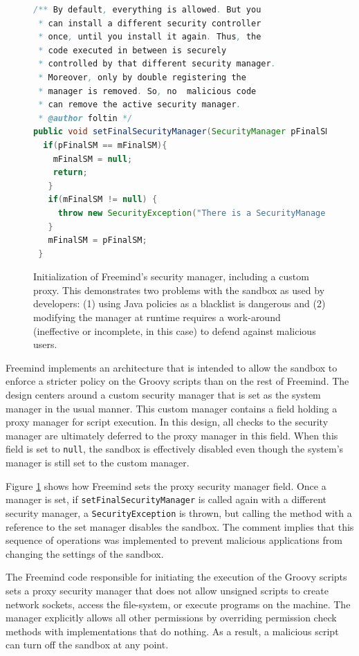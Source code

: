 \documentclass{sig-alternate-05-2015}
\begin{document}
\begin{figure}
\begin{lstlisting}[language=Java,firstnumber=31]
/** By default, everything is allowed. But you
 * can install a different security controller
 * once, until you install it again. Thus, the
 * code executed in between is securely
 * controlled by that different security manager.  
 * Moreover, only by double registering the
 * manager is removed. So, no  malicious code 
 * can remove the active security manager.  
 * @author foltin */
public void setFinalSecurityManager(SecurityManager pFinalSM) {
  if(pFinalSM == mFinalSM){
    mFinalSM = null;
    return;
   } 		
   if(mFinalSM != null) {
     throw new SecurityException("There is a SecurityManager installed already."); 		
   } 		
   mFinalSM = pFinalSM;
 }	
\end{lstlisting}
\caption{Initialization of Freemind's 
  \label{fig:Freemind-Security-Manager} security manager, including a custom proxy.
  This demonstrates two problems with the sandbox as used by developers: (1) 
  using Java policies as a blacklist is
  dangerous and (2) modifying the manager at runtime requires 
  a work-around (ineffective or incomplete, in this case) to defend against malicious
  users.}
\end{figure}

Freemind implements an architecture that is intended to allow the
sandbox to enforce a stricter policy on the Groovy scripts than on
the rest of Freemind. The design centers around a custom
security manager that is set as the system manager in the usual manner.
This custom manager contains a field holding a proxy manager for
script execution. In this design, all checks to the security manager are
ultimately 
deferred to the proxy manager in this field. When
this field is set to \texttt{null}, the sandbox is effectively disabled
even though the system's manager is still set to the custom manager.

Figure \ref{fig:Freemind-Security-Manager} shows how Freemind sets
the proxy security manager field.
Once a manager is set, if \texttt{setFinalSecurityManager} is called
again with a different security manager, a \texttt{SecurityException}
is thrown, but calling the method with a reference to the set manager disables
the sandbox. The comment implies that this sequence
of operations was implemented to prevent malicious applications from
changing the settings of the sandbox.

The Freemind code responsible for initiating the execution of the
Groovy scripts sets a proxy security manager that does not allow unsigned
scripts to create network sockets, access the file-system, or execute
programs on the machine. The manager explicitly allows all other permissions by overriding permission check methods with implementations that do nothing. As a result, a malicious script can turn off the sandbox at any point.
\end{document}
